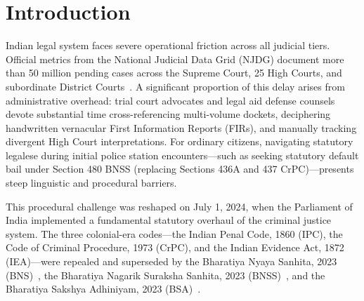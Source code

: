 \documentclass[conference]{IEEEtran}
\begin{document}
\section{Introduction}
 Indian legal system faces severe operational friction across all judicial tiers. Official metrics from the National Judicial Data Grid (NJDG) document more than 50 million pending cases across the Supreme Court, 25 High Courts, and subordinate District Courts~\cite{njdg2024}. A significant proportion of this delay arises from administrative overhead: trial court advocates and legal aid defense counsels devote substantial time cross-referencing multi-volume dockets, deciphering handwritten vernacular First Information Reports (FIRs), and manually tracking divergent High Court interpretations. For ordinary citizens, navigating statutory legalese during initial police station encounters—such as seeking statutory default bail under Section 480 BNSS (replacing Sections 436A and 437 CrPC)—presents steep linguistic and procedural barriers.

This procedural challenge was reshaped on July 1, 2024, when the Parliament of India implemented a fundamental statutory overhaul of the criminal justice system. The three colonial-era codes—the Indian Penal Code, 1860 (IPC), the Code of Criminal Procedure, 1973 (CrPC), and the Indian Evidence Act, 1872 (IEA)—were repealed and superseded by the Bharatiya Nyaya Sanhita, 2023 (BNS)~\cite{bns2023}, the Bharatiya Nagarik Suraksha Sanhita, 2023 (BNSS)~\cite{bnss2023}, and the Bharatiya Sakshya Adhiniyam, 2023 (BSA)~\cite{bsa2023}.
\end{document}
